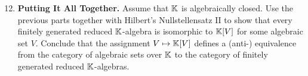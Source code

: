\documentclass[12pt,reqno]{amsart}
\begin{document}
\begin{enumerate}[leftmargin=*]
  \setcounter{enumi}{11}
\item \textbf{Putting It All Together.} Assume that $\mathbb{K}$ is algebraically closed. Use the previous parts together with Hilbert's Nullstellensatz II to show that every finitely generated reduced $\mathbb{K}$-algebra is isomorphic to $\mathbb{K}[V]$ for some algebraic set $V$.  Conclude that the assignment $V\mapsto \mathbb{K}[V]$ defines a  (anti-) equivalence from the category of algebraic sets over $\mathbb{K}$ to the category of finitely generated reduced $\mathbb{K}$-algebras. 


\end{enumerate}
\end{document}
